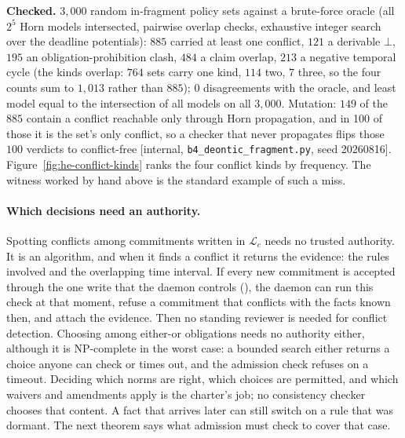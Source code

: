 \documentclass[11pt,a4paper]{article}
\theoremstyle{definition}
\theoremstyle{definition}
\theoremstyle{remark}
\begin{document}
\noindent\textbf{Checked.} $3{,}000$ random in-fragment policy sets against a
brute-force oracle (all $2^5$ Horn models intersected, pairwise overlap checks,
exhaustive integer search over the deadline potentials): $885$ carried at least
one conflict, $121$ a derivable $\bot$, $195$ an obligation-prohibition clash,
$484$ a claim overlap, $213$ a negative temporal cycle (the kinds overlap: $764$
sets carry one kind, $114$ two, $7$ three, so the four counts sum to $1{,}013$
rather than $885$); $0$ disagreements with the oracle, and least model equal to
the intersection of all models on all $3{,}000$. Mutation: $149$ of the $885$
contain a conflict reachable only through Horn propagation, and in 100 of
those it is the set's only conflict, so a checker that never propagates flips
those $100$ verdicts to conflict-free [internal,
\texttt{b4\_deontic\_fragment.py}, seed 20260816]. Figure~\ref{fig:he-conflict-kinds}
ranks the four conflict kinds by frequency. The witness worked by hand above
is the standard example of such a miss.



\paragraph{Which decisions need an authority.} Spotting conflicts among
commitments written in $\mathcal{L}_c$ needs no trusted authority. It is an algorithm, and when
it finds a conflict it returns the evidence: the rules involved and the
overlapping time interval. If every new commitment is accepted through the one
write that the daemon controls (), the
daemon can run this check at that moment, refuse a commitment that conflicts
with the facts known then, and attach the evidence. Then no standing reviewer
is needed for conflict detection. Choosing among either-or obligations needs no
authority either, although it is NP-complete in the worst case: a bounded
search either returns a choice anyone can check or times out, and the
admission check refuses on a timeout. Deciding which norms are right, which
choices are permitted, and which waivers and amendments apply is the
charter's job; no consistency checker chooses that content. A fact that
arrives later can still switch on a rule that was dormant. The next theorem
says what admission must check to cover that case.
\end{document}
